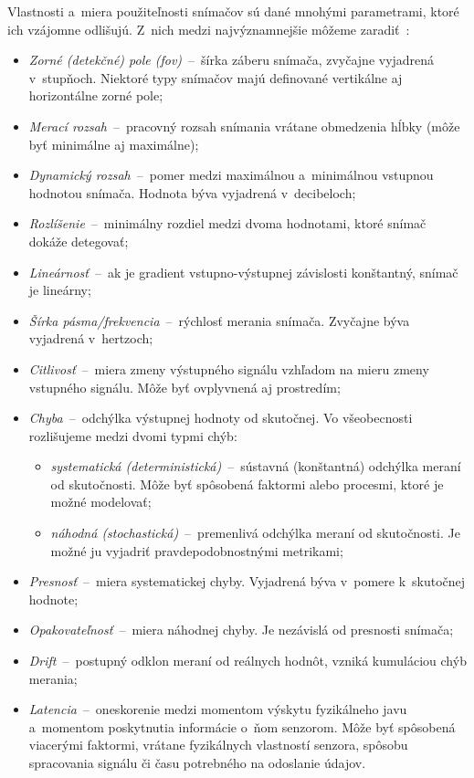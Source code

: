   Vlastnosti a~miera použiteľnosti snímačov sú dané mnohými parametrami, ktoré ich vzájomne odlišujú. Z~nich medzi najvýznamnejšie môžeme zaradiť~\cite{duchonSnimaceMobilnejRobotike2012}:
  \begin{itemize}
    \item \emph{Zorné (detekčné) pole (\acrshort{fov})}~--~šírka záberu snímača, zvyčajne vyjadrená v~stupňoch. Niektoré typy snímačov majú definované vertikálne aj horizontálne zorné pole;
    \item \emph{Merací rozsah}~--~pracovný rozsah snímania vrátane obmedzenia hĺbky (môže byť minimálne aj maximálne);
    \item \emph{Dynamický rozsah}~--~pomer medzi maximálnou a~minimálnou vstupnou hodnotou snímača. Hodnota býva vyjadrená v~decibeloch;
    \item \emph{Rozlíšenie}~--~minimálny rozdiel medzi dvoma hodnotami, ktoré snímač dokáže detegovať;
    \item \emph{Lineárnosť}~--~ak je gradient vstupno-výstupnej závislosti konštantný, snímač je lineárny;
    \item \emph{Šírka pásma/frekvencia}~--~rýchlosť merania snímača. Zvyčajne býva vyjadrená v~hertzoch;
    \item \emph{Citlivosť}~--~miera zmeny výstupného signálu vzhľadom na mieru zmeny vstupného signálu. Môže byť ovplyvnená aj prostredím;
    \item \emph{Chyba}~--~odchýlka výstupnej hodnoty od skutočnej. Vo všeobecnosti rozlišujeme medzi dvomi typmi chýb:
    \begin{itemize}
      \item \emph{systematická (deterministická)}~--~sústavná (konštantná) odchýlka meraní od skutočnosti. Môže byť spôsobená faktormi alebo procesmi, ktoré je možné modelovať;
      \item \emph{náhodná (stochastická)}~--~premenlivá odchýlka meraní od skutočnosti. Je možné ju vyjadriť pravdepodobnostnými metrikami;
    \end{itemize}
    \item \emph{Presnosť}~--~miera systematickej chyby. Vyjadrená býva v~pomere k~skutočnej hodnote;
    \item \emph{Opakovateľnosť}~--~miera náhodnej chyby. Je nezávislá od presnosti snímača;
    \item \emph{Drift}~--~postupný odklon meraní od reálnych hodnôt, vzniká kumuláciou chýb merania;
    \item \emph{Latencia}~--~oneskorenie medzi momentom výskytu fyzikálneho javu a~momentom poskytnutia informácie o~ňom senzorom. Môže byť spôsobená viacerými faktormi, vrátane fyzikálnych vlastností senzora, spôsobu spracovania signálu či času potrebného na odoslanie údajov.
  \end{itemize}

